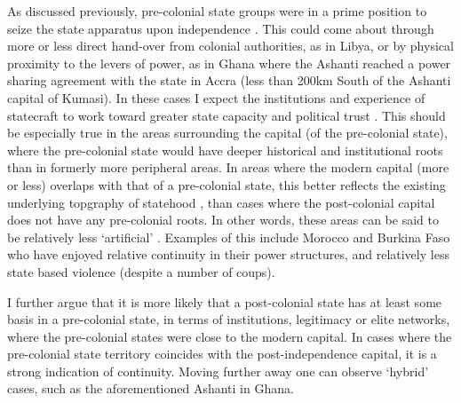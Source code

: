 \documentclass[12pt]{article}
\begin{document}
As discussed previously, pre-colonial state groups were in a prime position to
seize the state apparatus upon independence \citep{Paine2019,
Wucherpfennig2016}. This could come about through more or less direct hand-over
from colonial authorities, as in Libya, or by physical proximity to the levers
of power, as in Ghana where the Ashanti reached a power sharing agreement with
the state in Accra (less than 200km South of the Ashanti capital of Kumasi). In
these cases I expect the institutions and experience of statecraft to work
toward greater state capacity and political trust \citep{Depetris-Chauvin2016}.
This should be especially true in the areas surrounding the capital (of the
pre-colonial state), where the pre-colonial state would have deeper historical
and institutional roots than in formerly more peripheral areas. In areas where
the modern capital (more or less) overlaps with that of a pre-colonial state,
this better reflects the existing underlying topgraphy of statehood , than cases
where the post-colonial capital does not have any pre-colonial roots. In other
words, these areas can be said to be relatively less `artificial'
\citep{Alesina2011}. Examples of this include Morocco and Burkina Faso who have
enjoyed relative continuity in their power structures, and relatively less state
based violence (despite a number of coups). 

I further argue that it is more likely that a post-colonial state has at least
some basis in a pre-colonial state, in terms of institutions, legitimacy or
elite networks, where the pre-colonial states were close to the modern capital.
In cases where the pre-colonial state territory coincides with the
post-independence capital, it is a strong indication of continuity. Moving
further away one can observe `hybrid' cases, such as the aforementioned Ashanti
in Ghana.  
\end{document}
